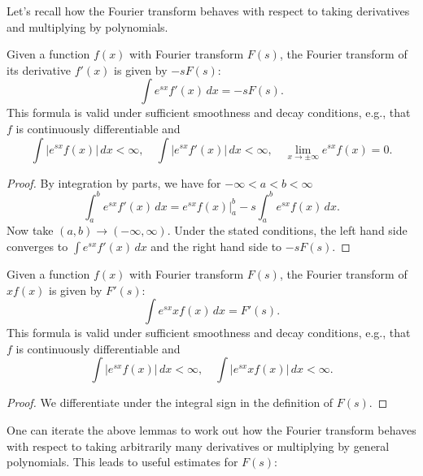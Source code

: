 \documentclass[reqno]{amsart}  \numberwithin{theorem}{section} \numberwithin{equation}{section}
\begin{document}
Let's recall how the Fourier transform behaves with respect to taking derivatives and multiplying by polynomials.
\begin{lemma}\label{lemma:cj4und9jny}
  Given a function $f(x)$ with Fourier transform $F(s)$, the Fourier transform of its derivative $f'(x)$ is given by $-s F(s)$:
  \begin{equation*}
    \int e^{s x} f' (x) \, d x = -s F (s).
  \end{equation*}
  This formula is valid under sufficient smoothness and decay conditions, e.g., that $f$ is continuously differentiable and
  \begin{equation*}
    \int \left\lvert e^{s x } f (x) \right\rvert \, d x  <\infty ,
    \quad 
    \int \left\lvert e^{s x } f ' (x) \right\rvert \, d x < \infty,
    \quad
    \lim_{x \rightarrow \pm \infty} e^{s x} f(x) =0.
  \end{equation*}
\end{lemma}
\begin{proof}
  By integration by parts, we have for $- \infty < a < b < \infty$
  \begin{equation*}
    \int_a^b e^{s x } f ' (x) \, d x =
    e^{s x } f(x) \vert_a^b - s \int_a^b e^{s x } f(x) \, d x.
  \end{equation*}
  Now take $(a,b) \rightarrow (-\infty,\infty)$.  Under the stated conditions, the left hand side converges to $\int e^{s x } f' (x) \, d x$ and the right hand side to $- s F(s)$.
\end{proof}
\begin{lemma}
  Given a function $f(x)$ with Fourier transform $F(s)$, the Fourier transform of $x f(x)$ is given by $F'(s)$:
  \begin{equation*}
    \int e^{s x } x f (x) \, d x = F'(s).
  \end{equation*}
  This formula is valid under sufficient smoothness and decay conditions, e.g., that $f$ is continuously differentiable and
  \begin{equation*}
    \int \left\lvert e^{s x } f (x) \right\rvert \, d x  <\infty ,
    \quad 
    \int \left\lvert e^{s x } x f (x) \right\rvert \, d x < \infty.
  \end{equation*}
\end{lemma}
\begin{proof}
  We differentiate under the integral sign in the definition of $F(s)$.
\end{proof}
One can iterate the above lemmas to work out how the Fourier transform behaves with respect to taking arbitrarily many derivatives or multiplying by general polynomials.  This leads to useful estimates for $F(s)$:
\end{document}
